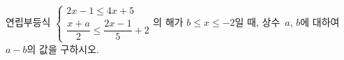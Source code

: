 연립부등식 $\begin{cases} 2x-1\le 4x+5 \\ \dfrac{x+a}{2}\le\dfrac{2x-1}{5}+2 \end{cases}$의 해가 $b\le x\le -2$일 때, 상수~$a$, $b$에 대하여 $a-b$의 값을 구하시오.
